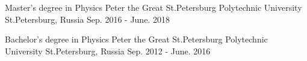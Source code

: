 

\begin{cventries}

  \cventry
    {Master's degree in Physics} %
    {Peter the Great St.Petersburg Polytechnic University} %
    {St.Petersburg, Russia} %
    {Sep. 2016 - June. 2018} %
    {}

  \cventry
    {Bachelor's degree in Physics} %
    {Peter the Great St.Petersburg Polytechnic University} %
    {St.Petersburg, Russia} %
    {Sep. 2012 - June. 2016} %
    {}

\end{cventries}